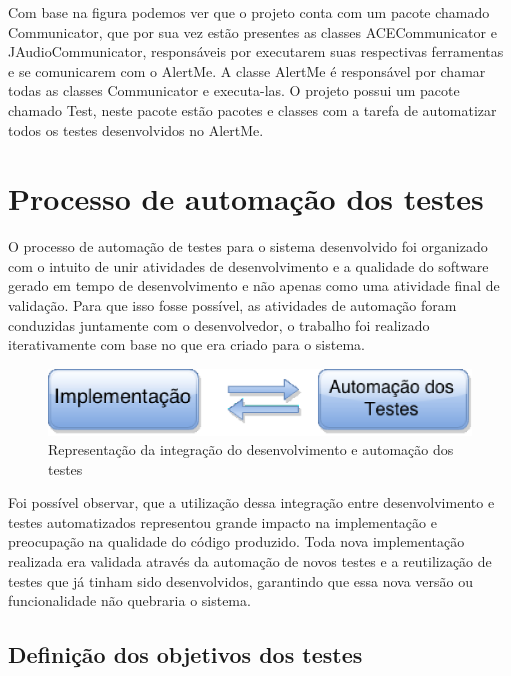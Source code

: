 Com base na figura podemos ver que o projeto conta com um pacote chamado Communicator, que por sua vez estão presentes as classes ACECommunicator e JAudioCommunicator, responsáveis por executarem suas respectivas ferramentas e se comunicarem com o AlertMe. A classe AlertMe é responsável por chamar todas as classes Communicator e executa-las. O projeto possui um pacote chamado Test, neste pacote estão pacotes e classes com a tarefa de automatizar todos os testes desenvolvidos no AlertMe. 

\section{Processo de automação dos testes}

O processo de automação de testes para o sistema desenvolvido foi organizado com o intuito de unir atividades de desenvolvimento e a qualidade do software gerado em tempo de desenvolvimento e não apenas como uma atividade final de validação. Para que isso fosse possível, as atividades de automação foram conduzidas juntamente com o desenvolvedor, o trabalho foi realizado iterativamente com base no que era criado para o sistema.

\begin{figure}[H]
	\centering
	\captionsetup{justification=centering,margin=2cm}
	\includegraphics[scale=0.80]{capitulos/validacao/figuras/automationTestProcess.eps}
	\caption{Representação da integração do desenvolvimento e automação dos testes}
	\label{fig:result-engajamento}
\end{figure}

Foi possível observar, que a utilização dessa integração entre desenvolvimento e testes automatizados representou grande impacto na implementação e preocupação na qualidade do código produzido. Toda nova implementação realizada era validada através da automação de novos testes e a reutilização de testes que já tinham sido desenvolvidos, garantindo que essa nova versão ou funcionalidade não quebraria o sistema.

\subsection{Definição dos objetivos dos testes}

